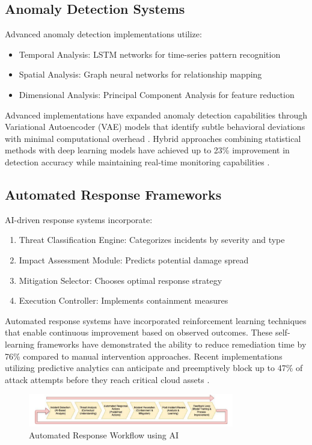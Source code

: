 \documentclass[a4paper,12pt]{article}
\begin{document}
\subsection{Anomaly Detection Systems}
Advanced anomaly detection implementations utilize:
\begin{itemize}
    \item Temporal Analysis: LSTM networks for time-series pattern recognition
    \item Spatial Analysis: Graph neural networks for relationship mapping
    \item Dimensional Analysis: Principal Component Analysis for feature reduction
\end{itemize}

Advanced implementations have expanded anomaly detection capabilities through Variational Autoencoder (VAE) models that identify subtle behavioral deviations with minimal computational overhead \citet{mahdavifar2019}. Hybrid approaches combining statistical methods with deep learning models have achieved up to 23\% improvement in detection accuracy while maintaining real-time monitoring capabilities \citet{zhou2023}.

\subsection{Automated Response Frameworks}
AI-driven response systems incorporate:
\begin{enumerate}
    \item Threat Classification Engine: Categorizes incidents by severity and type
    \item Impact Assessment Module: Predicts potential damage spread
    \item Mitigation Selector: Chooses optimal response strategy
    \item Execution Controller: Implements containment measures
\end{enumerate}

Automated response systems have incorporated reinforcement learning techniques that enable continuous improvement based on observed outcomes. These self-learning frameworks have demonstrated the ability to reduce remediation time by 76\% compared to manual intervention approaches. Recent implementations utilizing predictive analytics can anticipate and preemptively block up to 47\% of attack attempts before they reach critical cloud assets \citet{kumar2021}.

\begin{figure}[H]
    \centering
    \includegraphics[width=0.8\textwidth]{image2.png}
    \caption{Automated Response Workflow using AI}
    \label{fig:auto-workflow-ai}
\end{figure}
\end{document}
